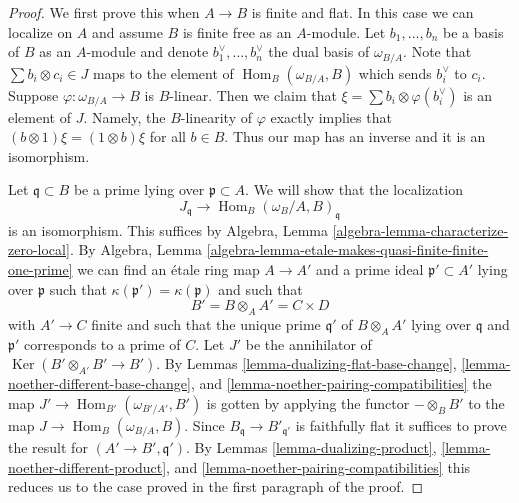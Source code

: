 \documentclass[10pt,a4paper]{amsart}
\theoremstyle{plain}
\theoremstyle{definition}
\theoremstyle{remark}
\numberwithin{equation}{subsection}
\def\Hom{\mathop{\mathrm{Hom}}\nolimits}
\def\Ker{\mathop{\mathrm{Ker}}}
\begin{document}
\begin{proof}
We first prove this when $A \to B$ is finite and flat. In this case we can
localize on $A$ and assume $B$ is finite free as an $A$-module. Let
$b_1, \ldots, b_n$ be a basis of $B$ as an $A$-module and denote
$b_1^\vee, \ldots, b_n^\vee$ the dual basis of $\omega_{B/A}$. Note that
$\sum b_i \otimes c_i \in J$ maps to the element of $\Hom_B(\omega_{B/A}, B)$
which sends $b_i^\vee$ to $c_i$. Suppose $\varphi : \omega_{B/A} \to B$
is $B$-linear. Then we claim that $\xi = \sum b_i \otimes \varphi(b_i^\vee)$
is an element of $J$. Namely, the $B$-linearity of $\varphi$
exactly implies that $(b \otimes 1)\xi = (1 \otimes b)\xi$ for all $b \in B$.
Thus our map has an inverse and it is an isomorphism.

\medskip\noindent
Let $\mathfrak q \subset B$ be a prime lying over $\mathfrak p \subset A$.
We will show that the localization
$$
J_\mathfrak q
\longrightarrow
\Hom_B(\omega_B/A, B)_\mathfrak q
$$
is an isomorphism.
This suffices by Algebra, Lemma \ref{algebra-lemma-characterize-zero-local}.
By
Algebra, Lemma \ref{algebra-lemma-etale-makes-quasi-finite-finite-one-prime}
we can find an \'etale ring map $A \to A'$ and a prime
ideal $\mathfrak p' \subset A'$ lying over $\mathfrak p$
such that $\kappa(\mathfrak p') = \kappa(\mathfrak p)$ and
such that
$$
B' = B \otimes_A A' = C \times D
$$
with $A' \to C$ finite and such that the unique prime $\mathfrak q'$
of $B \otimes_A A'$ lying over $\mathfrak q$ and $\mathfrak p'$
corresponds to a prime of $C$. Let $J'$ be the annihilator of
$\Ker(B' \otimes_{A'} B' \to B')$. By
Lemmas \ref{lemma-dualizing-flat-base-change},
\ref{lemma-noether-different-base-change}, and
\ref{lemma-noether-pairing-compatibilities}
the map $J' \to \Hom_{B'}(\omega_{B'/A'}, B')$
is gotten by applying the functor $- \otimes_B B'$
to the map $J \to \Hom_B(\omega_{B/A}, B)$.
Since $B_\mathfrak q \to B'_{\mathfrak q'}$ is faithfully flat
it suffices to prove the result for $(A' \to B', \mathfrak q')$.
By Lemmas \ref{lemma-dualizing-product},
\ref{lemma-noether-different-product}, and
\ref{lemma-noether-pairing-compatibilities}
this reduces us to the case proved in the first
paragraph of the proof.
\end{proof}
\end{document}
